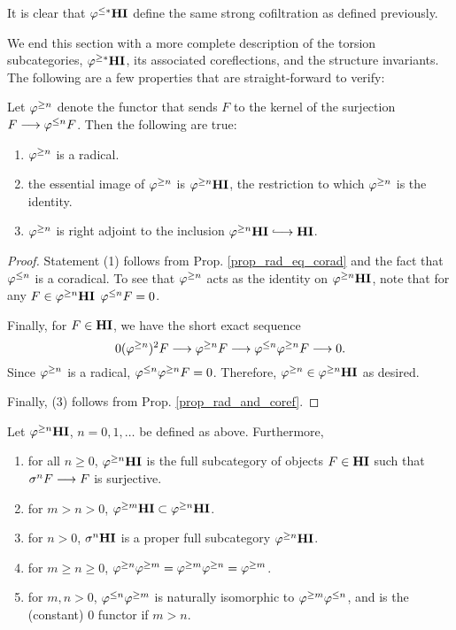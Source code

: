 It is clear that $\varphi^{\leq *}\mathbf{HI}$ define the same strong cofiltration as
defined previously. 

We end this section with a more complete description of the 
torsion subcategories, $\varphi^{\geq *}\mathbf{HI}$, its associated coreflections, and
the structure invariants. The following are a few properties that 
are straight-forward to verify:

\begin{prop} 
Let $\varphi^{\geq n}$ denote the functor that sends $F$ to the kernel of
the surjection $F \longrightarrow \varphi^{\leq n}F$. Then the following are true:
\begin{enumerate}
\item $\varphi^{\geq n}$ is a radical.
\tinyskip

\item the essential image of $\varphi^{\geq n}$ is $\varphi^{\geq n}\mathbf{HI}$, the 
restriction to which $\varphi^{\geq n}$ is the identity.
\tinyskip

\item $\varphi^{\geq n}$ is right adjoint to the inclusion $\THI{n} \into 
\HI$.
\tinyskip
\end{enumerate}
\end{prop}
\begin{proof}
Statement (1) follows from Prop. \ref{prop_rad_eq_corad} and
the fact that $\varphi^{\leq n}$ is a coradical. To see that $\varphi^{\geq n}$
acts as the identity on $\varphi^{\geq n}\mathbf{HI}$, note that for any $F \in \varphi^{\geq n}\mathbf{HI}$
$\varphi^{\leq n} F = 0$. 

Finally, for $F \in \mathbf{HI}$, we have the short exact sequence
\[
0 (\varphi^{\geq n})^2 F \longrightarrow \varphi^{\geq n}F \longrightarrow \varphi^{\leq n} \varphi^{\geq n}F \longrightarrow 0.
\]
Since $\varphi^{\geq n}$ is a radical, $\varphi^{\leq n} \varphi^{\geq n}F = 0$. Therefore,
$\varphi^{\geq n} \in \varphi^{\geq n}\mathbf{HI}$ as desired.

Finally, (3) follows from Prop. \ref{prop_rad_and_coref}.
\end{proof}

\begin{prop}\label{prop_THI_properties}
Let $\varphi^{\geq n}\mathbf{HI}$, $n = 0, 1,\dots$ be defined as above. Furthermore,

\begin{enumerate}
\item for all $n \geq 0$, $\varphi^{\geq n}\mathbf{HI}$ is the full subcategory of
objects $F \in \mathbf{HI}$ such that $\sigma^{n}F \longrightarrow F$ is surjective.
\tinyskip

\item for $m > n > 0$, $\varphi^{\geq m}\mathbf{HI} \subset \varphi^{\geq n}\mathbf{HI}$.
\tinyskip

\item for $n > 0$, $\sigma^{n} \mathbf{HI}$ is a proper full subcategory 
$\varphi^{\geq n}\mathbf{HI}$.
\tinyskip

\item for $m \geq n \geq 0$, $\varphi^{\geq n}\varphi^{\geq m} = \varphi^{\geq m}\varphi^{\geq n} =
\varphi^{\geq m}$.
\tinyskip

\item for $m, n > 0$, $\varphi^{\leq n}\varphi^{\geq m}$ is naturally isomorphic 
to $\varphi^{\geq m}\varphi^{\leq n}$, and is the (constant) $0$ functor if $m > n$.
\tinyskip

\end{enumerate}
\end{prop}

